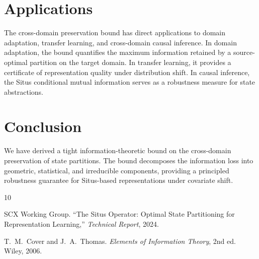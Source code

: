 \documentclass[12pt,a4paper]{article}
\begin{document}
\section{Applications}
\label{sec:applications}

The cross-domain preservation bound has direct applications to domain adaptation, transfer learning, and cross-domain causal inference. In domain adaptation, the bound quantifies the maximum information retained by a source-optimal partition on the target domain. In transfer learning, it provides a certificate of representation quality under distribution shift. In causal inference, the Situs conditional mutual information serves as a robustness measure for state abstractions.

\section{Conclusion}

We have derived a tight information-theoretic bound on the cross-domain preservation of state partitions. The bound decomposes the information loss into geometric, statistical, and irreducible components, providing a principled robustness guarantee for Situs-based representations under covariate shift.


\begin{thebibliography}{10}

SCX Working Group.
\newblock ``The Situs Operator: Optimal State Partitioning for Representation Learning,''
\newblock \emph{Technical Report}, 2024.

T.~M.~Cover and J.~A.~Thomas.
\newblock \emph{Elements of Information Theory}, 2nd ed.
\newblock Wiley, 2006.

\end{thebibliography}
\end{document}
